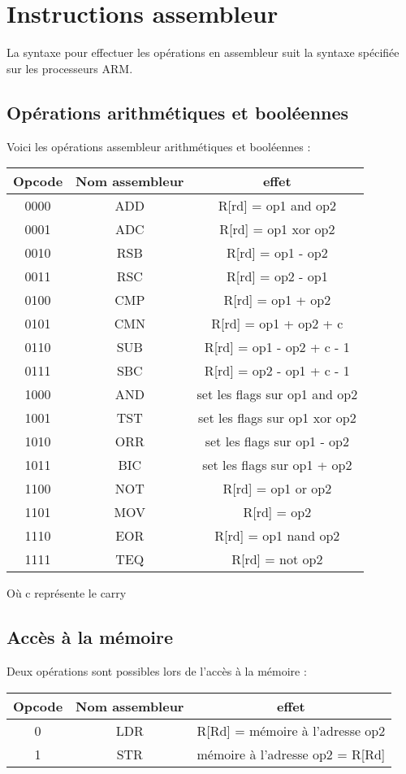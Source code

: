 \documentclass[a4paper]{article}
\begin{document}
\section{Instructions assembleur}

La syntaxe pour effectuer les opérations en assembleur suit la syntaxe spécifiée
sur les processeurs ARM.

\subsection{Opérations arithmétiques et booléennes}

Voici les opérations assembleur arithmétiques et booléennes :\\

\begin{tabular}{|c|c|c|}
  \hline
  Opcode & Nom assembleur & effet \\
  \hline
  0000 & ADD & R[rd] = op1 and op2\\
  0001 & ADC & R[rd] = op1 xor op2\\
  0010 & RSB & R[rd] = op1 - op2\\
  0011 & RSC & R[rd] = op2 - op1\\
  0100 & CMP & R[rd] = op1 + op2\\
  0101 & CMN & R[rd] = op1 + op2 + c\\
  0110 & SUB & R[rd] = op1 - op2 + c - 1\\
  0111 & SBC & R[rd] = op2 - op1 + c - 1\\
  1000 & AND & set les flags sur op1 and op2\\
  1001 & TST & set les flags sur op1 xor op2\\
  1010 & ORR & set les flags sur op1 - op2\\
  1011 & BIC & set les flags sur op1 + op2\\
  1100 & NOT & R[rd] = op1 or op2\\
  1101 & MOV & R[rd] = op2\\
  1110 & EOR & R[rd] = op1 nand op2\\
  1111 & TEQ & R[rd] = not op2\\
  \hline
\end{tabular}

Où c représente le carry

\subsection{Accès à la mémoire}

Deux opérations sont possibles lors de l'accès à la mémoire :\\

\begin{tabular}{|c|c|c|}
  \hline
  Opcode & Nom assembleur & effet\\
  \hline
  0 & LDR & R[Rd] = mémoire à l'adresse op2\\
  1 & STR & mémoire à l'adresse op2 = R[Rd]\\
  \hline

\end{tabular}
\end{document}
